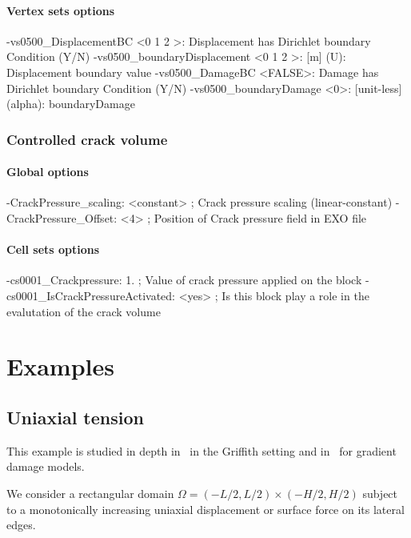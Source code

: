 \documentclass[10pt,oneside]{memoir}
\begin{document}
\subsubsection{Vertex sets options}
\small{\begin{boxedverbatim}
-vs0500_DisplacementBC <0 1 2 >: Displacement has Dirichlet boundary Condition (Y/N) 
-vs0500_boundaryDisplacement <0 1 2 >: [m] (U): Displacement boundary value 
-vs0500_DamageBC <FALSE>: Damage has Dirichlet boundary Condition (Y/N) 
-vs0500_boundaryDamage <0>: [unit-less] (alpha): boundaryDamage 
\end{boxedverbatim}}


\subsection{Controlled crack volume}

\subsubsection{Global options}
\small{\begin{boxedverbatim}
-CrackPressure_scaling: <constant> ; Crack pressure scaling (linear-constant)
-CrackPressure_Offset: <4> ; Position of Crack pressure field in EXO file 
\end{boxedverbatim}}


\subsubsection{Cell sets options}
\small{\begin{boxedverbatim}
-cs0001_Crackpressure: 1. ; Value of crack pressure applied on the block
-cs0001_IsCrackPressureActivated: <yes> ; Is this block play a role in the evalutation of the crack volume 
\end{boxedverbatim}}

\chapter{Examples}
\section{Uniaxial tension}
This example is studied in depth in~\cite[Section 3.1]{Bourdin-Francfort-EtAl-2008b} in the Griffith setting and in~\cite{Pham-Amor-EtAl-2011a} for gradient damage models.


We consider a rectangular domain $\Omega = (-L/2,L/2) \times (-H/2,H/2)$ subject to a monotonically increasing uniaxial displacement or surface force on its lateral edges. 
\end{document}
